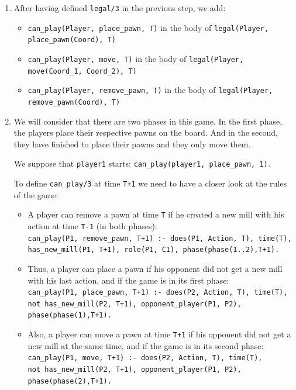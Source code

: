 \begin{enumerate}
\item After having defined \texttt{legal/3} in the previous step, we add:
\begin{itemize}
\item \texttt{can\_play(Player, place\_pawn, T)} in the body of \texttt{legal(Player, \\place\_pawn(Coord), T) }
\item \texttt{can\_play(Player, move, T)} in the body of \texttt{legal(Player, move(Coord\_1, Coord\_2), T) }
\item \texttt{can\_play(Player, remove\_pawn, T)} in the body of \texttt{legal(Player, \\remove\_pawn(Coord), T) }
\end{itemize}

\item 
We will consider that there are two phases in this game. In the first phase, the players place their respective pawns on the board. And in the second, they have finished to place their pawns and they only move them. 

\bigskip

We suppose that \texttt{player1} starts:
\texttt{can\_play(player1, place\_pawn, 1).} 

\bigskip

To define \texttt{can\_play/3} at time \texttt{T+1} we need to have a closer look at the rules of the game:

\begin{itemize}
\item A player can remove a pawn  at time \texttt{T} if he created a new mill with his action at time \texttt{T-1} (in both phases):\\
\texttt{can\_play(P1, remove\_pawn, T+1) :- does(P1, Action, T), time(T), has\_new\_mill(P1, T+1), role(P1, C1),  phase(phase(1..2),T+1).}
\item Thus, a player can place a pawn if his opponent did not get a new mill with his last action, and if the game is in its first phase:\\
\texttt{can\_play(P1, place\_pawn, T+1) :- does(P2, Action, T), time(T), not has\_new\_mill(P2, T+1), opponent\_player(P1, P2), phase(phase(1),T+1).}
\item Also, a player can move a pawn at time \texttt{T+1} if his opponent did not get a new mill at the same time, and if the game is in its second phase:\\ 
\texttt{can\_play(P1, move, T+1) :- does(P2, Action, T), time(T), \\not has\_new\_mill(P2, T+1), opponent\_player(P1, P2), phase(phase(2),T+1).}
\end{itemize}


\end{enumerate}
